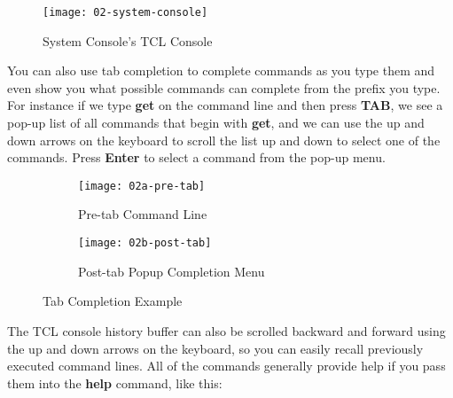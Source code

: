 \begin{flushleft}
\begin{enumerate}[
	label=\textbf{Step \arabic*.},
	leftmargin=*,
	widest={00},
	align=left]
\begin{tcolorbox}[
	colback=MyMintedBGColor,
	colframe=MyMintedBGColor,
	]
\end{tcolorbox}

\begin{figure}[H]
\centering
\texttt{[image: 02-system-console]}
\caption{System Console's TCL Console}
\label{fig:02-system-console}
\end{figure}

\newpage

You can also use tab completion to complete commands as you type them and even show you what possible commands can complete from the prefix you type.  For instance if we type \textbf{get} on the command line and then press \textbf{TAB}, we see a pop-up list of all commands that begin with \textbf{get}, and we can use the up and down arrows on the keyboard to scroll the list up and down to select one of the commands.  Press \textbf{Enter} to select a command from the pop-up menu.

\begin{figure}[H]
\begin{subfigure}{0.495\textwidth}
\centering
\texttt{[image: 02a-pre-tab]}
\caption{Pre-tab Command Line}
\label{fig:02a-pre-tab}
\end{subfigure}
\begin{subfigure}{0.495\textwidth}
\centering
\texttt{[image: 02b-post-tab]}
\caption{Post-tab Popup Completion Menu}
\label{fig:02b-post-tab}
\end{subfigure}
\caption{Tab Completion Example}
\label{fig:tab-completion}
\end{figure}

The TCL console history buffer can also be scrolled backward and forward using the up and down arrows on the keyboard, so you can easily recall previously executed command lines.
\newline
\newline
All of the commands generally provide help if you pass them into the \textbf{help} command, like this:

\begin{verbatim}


\end{verbatim}
\end{enumerate}
\end{flushleft}
